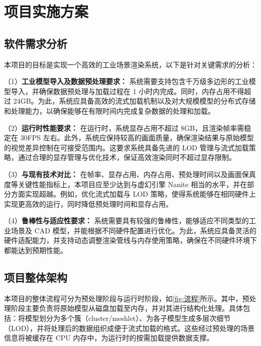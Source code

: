 \cleardoublepage

\section{项目实施方案}

\subsection{软件需求分析}

本项目的目标是实现一个高效的工业场景渲染系统，以下是针对关键需求的分析：

\par （1）\textbf{工业模型导入及数据预处理要求：}  
系统需要支持包含千万级多边形的工业模型导入，并确保数据预处理与加载过程在 1 小时内完成。同时，内存占用不得超过 24GB。为此，系统应具备高效的流式加载机制以及对大规模模型的分布式存储和处理能力，以确保能够在有限时间内完成复杂数据的处理和加载。

\par （2）\textbf{运行时性能要求：}  
在运行时，系统显存占用不超过 8GB，且渲染帧率需稳定在 30FPS 左右。此外，系统应保持较高的画面质量，确保渲染结果与原始模型的视觉差异控制在可接受范围内。这要求系统具备先进的 LOD 管理与流式加载策略，通过合理的显存管理与优化技术，保证高效渲染同时不超过显存限制。

\par （3）\textbf{与现有技术对比：}  
在帧率、显存占用、内存占用、预处理时间以及画面保真度等关键性能指标上，本项目应至少达到与虚幻引擎 Nanite 相当的水平，并在部分方面实现超越。例如，优化流式加载与 LOD 策略，使得系统能够在相同硬件上实现更高效的运行，同时降低预处理时间和显存占用。

\par （4）\textbf{鲁棒性与适应性要求：}  
系统需要具有较强的鲁棒性，能够适应不同类型的工业场景及 CAD 模型，并能根据不同硬件配置进行优化。为此，系统应具备灵活的硬件适配能力，并支持动态调整渲染管线与内存使用策略，确保在不同硬件环境下都能达到预期性能。

\subsection{项目整体架构}

\par 本项目的整体流程可分为预处理阶段与运行时阶段，如\autoref{fig:流程}所示。其中，预处理阶段主要负责将原始模型从磁盘加载至内存，并对其进行结构化处理。具体包括：将模型划分为多个簇（cluster/meshlet）、为各子模型生成多层次细节（LOD），并将处理后的数据组织成便于流式加载的格式。这些经过预处理的场景信息将被缓存在 CPU 内存中，为运行时的按需加载提供数据支撑。

